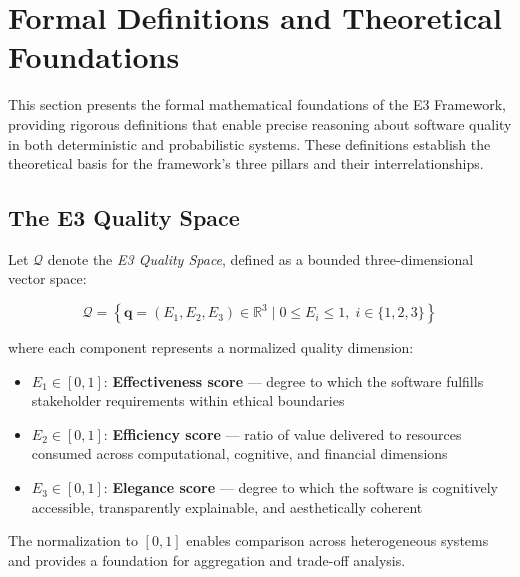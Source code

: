 
\section{Formal Definitions and Theoretical Foundations}
\label{sec:formal_definitions}

This section presents the formal mathematical foundations of the E3 Framework, providing rigorous definitions that enable precise reasoning about software quality in both deterministic and probabilistic systems. These definitions establish the theoretical basis for the framework's three pillars and their interrelationships.

\subsection{The E3 Quality Space}

\begin{definition}
\label{def:quality_vector}
Let $\mathcal{Q}$ denote the \emph{E3 Quality Space}, defined as a bounded three-dimensional vector space:

\begin{equation}
\mathcal{Q} = \left\{ \mathbf{q} = (E_1, E_2, E_3) \in \mathbb{R}^3 \mid 0 \leq E_i \leq 1, \; i \in \{1, 2, 3\} \right\}
\end{equation}

where each component represents a normalized quality dimension:
\begin{itemize}[leftmargin=2em]
    \item $E_1 \in [0,1]$: \textbf{Effectiveness score} --- degree to which the software fulfills stakeholder requirements within ethical boundaries
    \item $E_2 \in [0,1]$: \textbf{Efficiency score} --- ratio of value delivered to resources consumed across computational, cognitive, and financial dimensions
    \item $E_3 \in [0,1]$: \textbf{Elegance score} --- degree to which the software is cognitively accessible, transparently explainable, and aesthetically coherent
\end{itemize}
\end{definition}

The normalization to $[0,1]$ enables comparison across heterogeneous systems and provides a foundation for aggregation and trade-off analysis.

